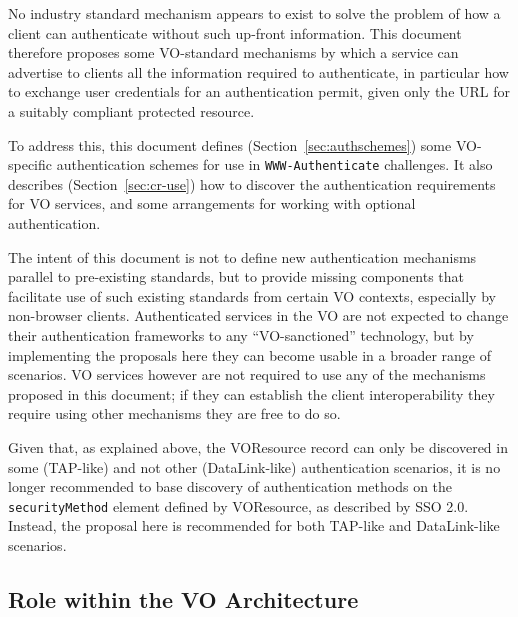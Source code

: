 \documentclass[11pt,a4paper]{ivoa}
\newcommand{\header}[1]{{\tt #1}}
\begin{document}
No industry standard mechanism appears to exist to solve the
problem of how a client can authenticate without such up-front
information.
This document therefore proposes some VO-standard mechanisms
by which a service can advertise to clients all the information
required to authenticate,
in particular how to exchange user credentials for an authentication permit,
given only the URL for a suitably compliant protected resource.

To address this, this document defines (Section~\ref{sec:authschemes})
some VO-specific authentication schemes
for use in \header{WWW-Authenticate} challenges.
It also describes (Section~\ref{sec:cr-use}) how to discover the
authentication requirements for VO services, and
some arrangements for working with optional authentication.

The intent of this document is not to define new authentication
mechanisms parallel to pre-existing standards, but to provide
missing components that facilitate use of such existing standards
from certain VO contexts, especially by non-browser clients.
Authenticated services in the VO are not expected to change their
authentication frameworks to any ``VO-sanctioned'' technology,
but by implementing the proposals here they can become usable
in a broader range of scenarios.
VO services however are not required to use any of the  
mechanisms proposed in this document; if they can establish the
client interoperability they require using other mechanisms
they are free to do so.

Given that, as explained above,
the VOResource record can only be discovered in some (TAP-like)
and not other (DataLink-like) authentication scenarios,
it is no longer recommended to base discovery of authentication methods
on the {\tt securityMethod} element
defined by VOResource, as described by SSO 2.0.
Instead, the proposal here is recommended for both TAP-like and DataLink-like
scenarios.

\subsection{Role within the VO Architecture}
\end{document}
